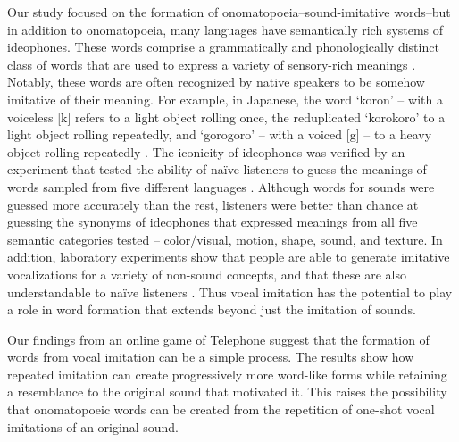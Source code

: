 \documentclass[10pt,letterpaper]{article}
\begin{document}
Our study focused on the formation of onomatopoeia--sound-imitative
words--but in addition to onomatopoeia, many languages have semantically
rich systems of ideophones. These words comprise a grammatically and
phonologically distinct class of words that are used to express a
variety of sensory-rich meanings
\cite{Dingemanse:2012fc, Voeltz:2001vv}. Notably, these words are often
recognized by native speakers to be somehow imitative of their meaning.
For example, in Japanese, the word `koron' -- with a voiceless {[}k{]}
refers to a light object rolling once, the reduplicated `korokoro' to a
light object rolling repeatedly, and `gorogoro' -- with a voiced {[}g{]}
-- to a heavy object rolling repeatedly \cite{Imai:2014dea}. The
iconicity of ideophones was verified by an experiment that tested the
ability of naïve listeners to guess the meanings of words sampled from
five different languages \cite{Dingemanse:2016vd}. Although words for
sounds were guessed more accurately than the rest, listeners were better
than chance at guessing the synonyms of ideophones that expressed
meanings from all five semantic categories tested -- color/visual,
motion, shape, sound, and texture. In addition, laboratory experiments
show that people are able to generate imitative vocalizations for a
variety of non-sound concepts, and that these are also understandable to
naïve listeners \cite{Perlman:2015ip}. Thus vocal imitation has the
potential to play a role in word formation that extends beyond just the
imitation of sounds.

Our findings from an online game of Telephone suggest that the formation
of words from vocal imitation can be a simple process. The results show
how repeated imitation can create progressively more word-like forms
while retaining a resemblance to the original sound that motivated it.
This raises the possibility that onomatopoeic words can be created from
the repetition of one-shot vocal imitations of an original sound.



\end{document}
